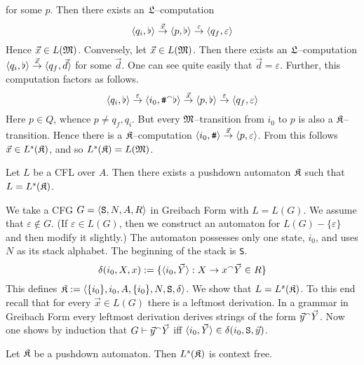 for some $p$. Then there exists an $\mathfrak{L}$--computation
\begin{equation}
\langle q_i, \flat\rangle \stackrel{\vec{x}}{\rightarrow} \langle p, \flat\rangle
\stackrel{\varepsilon}{\rightarrow} \langle q_f, \varepsilon\rangle
\end{equation}
Hence $\vec{x} \in L(\mathfrak{M})$. Conversely, let $\vec{x} \in L(\mathfrak{M})$.
Then there exists an $\mathfrak{L}$--com\-pu\-ta\-tion $\langle q_i, \flat\rangle
\stackrel{\vec{x}}{\rightarrow} \langle q_f, \vec{d}\rangle$ for some $\vec{d}$.
One can see quite easily that $\vec{d} = \varepsilon$. Further,
this computation factors as follows.
\begin{equation}
\langle q_i, \flat\rangle \stackrel{\varepsilon}{\rightarrow}
\langle i_0, \mbox{\tt \#} {^{\smallfrown}} \flat\rangle \stackrel{\vec{x}}{\rightarrow}
\langle p, \flat\rangle \stackrel{\varepsilon}{\rightarrow}
\langle q_f, \varepsilon\rangle
\end{equation}
Here $p \in Q$, whence $p \neq q_f, q_i$. But every
$\mathfrak{M}$--transition from $i_0$ to $p$ is also a $\mathfrak{K}$--transition.
Hence there is a $\mathfrak{K}$--computation
$\langle i_0, \mbox{\tt \#}\rangle \stackrel{\vec{x}}{\rightarrow}
\langle p, \varepsilon\rangle$. From this follows $\vec{x} \in L^s(\mathfrak{K})$,
and so $L^s(\mathfrak{K}) = L(\mathfrak{M})$.
\proofend
\begin{lem}
Let $L$ be a CFL over $A$. Then there exists
a pushdown automaton $\mathfrak{K}$ such that $L = L^s(\mathfrak{K})$.
\end{lem}
\proofbeg
We take a CFG $G = \langle \mbox{\tt S}, N, A, R\rangle$
in Greibach Form with $L = L(G)$. We assume that
$\varepsilon \not\in G$. (If $\varepsilon \in L(G)$, then we 
construct an automaton for $L(G) - \{\varepsilon\}$ and then
modify it slightly.) The automaton possesses only one state, $i_0$,
and uses $N$ as its stack alphabet. The beginning of the stack
is {\tt S}.
\begin{equation}
\delta(i_0, X, x) := \{\langle i_0, \vec{Y}\rangle :
X \rightarrow x {^{\smallfrown}} \vec{Y} \in R\}
\end{equation}
This defines $\mathfrak{K} := \langle \{i_0\}, i_0, A, \{i_0\},
N, \mbox{\tt S}, \delta\rangle$. We show that $L = L^s(\mathfrak{K})$. To
this end recall that for every $\vec{x} \in L(G)$ there is a
leftmost derivation. In a grammar in Greibach Form every
leftmost derivation derives strings of the form
$\vec{y} {^{\smallfrown}} \vec{Y}$. Now one shows by induction that
$G \vdash \vec{y} {^{\smallfrown}} \vec{Y}$ iff $\auf i_0, %
\vec{Y}\zu \in \delta(i_0, \mbox{\tt S}, \vec{y})$.
\proofend
\begin{lem}
\label{prop:stapel}
Let $\mathfrak{K}$ be a pushdown automaton. Then $L^s(\mathfrak{K})$
is context free.
\end{lem}

